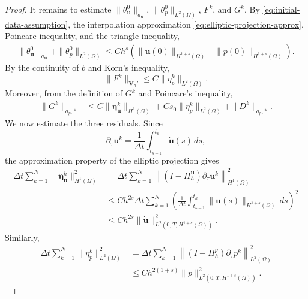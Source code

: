 \documentclass{amsart}
\begin{document}
\begin{proof}
It remains to estimate $\|\theta_{\boldsymbol u}^0\|_{a_{\boldsymbol u}}$, $\|\theta_p^0\|_{L^2(\Omega)}$, $F^k$, and $G^k$. By \eqref{eq:initial-data-assumption}, the interpolation approximation \eqref{eq:elliptic-projection-approx}, Poincare inequality, and the triangle inequality, 
%
\begin{align}
    \|\theta_{\boldsymbol u}^0\|_{a_{\boldsymbol u}} + \|\theta_p^0\|_{L^2(\Omega)} \le Ch^{s} (\|\boldsymbol{u}(0)\|_{H^{1+s}(\Omega)} + \|p(0)\|_{H^{1+s}(\Omega)} ).
\end{align}
%
By the continuity of $b$ and Korn's inequality,
\[
        \|F^k\|_{\boldsymbol V_h'}
        \le
        C\|\eta_p^k\|_{L^2(\Omega)}.
\]
Moreover, from the definition of $G^k$ and Poincare's inequality,
\[
\begin{aligned}
\|G^k\|_{a_p,*}
&\le
C\|\boldsymbol\eta_{\boldsymbol u}^k\|_{H^1(\Omega)}
+
C s_0\|\eta_p^k\|_{L^2(\Omega)}
+
\|D^k\|_{a_p,*}.
\end{aligned}
\]
We now estimate the three residuals. Since
\[
        \partial_\tau \boldsymbol u^k
        =
        \frac1{\Delta t}
        \int_{t_{k-1}}^{t_k}
        \dot{\boldsymbol u}(s)\,ds,
\]
the approximation property of the elliptic projection gives
\[
\begin{aligned}
\Delta t\sum_{k=1}^N
\|\boldsymbol\eta_{\boldsymbol u}^k\|_{H^1(\Omega)}^2
&=
\Delta t\sum_{k=1}^N
\left\|
(I-\Pi_h^{\boldsymbol u})\partial_\tau\boldsymbol u^k
\right\|_{H^1(\Omega)}^2
\\
&\le
C h^{2s}
\Delta t\sum_{k=1}^N
\left(
\frac1{\Delta t}
\int_{t_{k-1}}^{t_k}
\|\dot{\boldsymbol u}(s)\|_{H^{1+s}(\Omega)}\,ds
\right)^2
\\
&\le
C h^{2s}
\|\dot{\boldsymbol u}\|_{L^2(0,T;H^{1+s}(\Omega))}^2 .
\end{aligned}
\]
Similarly,
\[
\begin{aligned}
\Delta t\sum_{k=1}^N
\|\eta_p^k\|_{L^2(\Omega)}^2
&=
\Delta t\sum_{k=1}^N
\left\|
(I-\Pi_h^p)\partial_\tau p^k
\right\|_{L^2(\Omega)}^2
\\
&\le
C h^{2(1+s)}
\|\dot p\|_{L^2(0,T;H^{1+s}(\Omega))}^2 .
\end{aligned}
\]
\end{proof}
\end{document}

